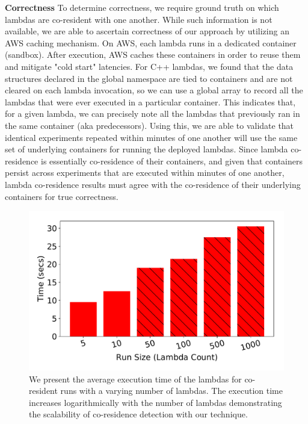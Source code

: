 \textbf{Correctness} 
To determine correctness, we require ground truth on which lambdas are
co-resident with one another. While such information is not available, we are
able to ascertain correctness of our approach by utilizing an AWS caching
mechanism. On AWS, each lambda runs in a dedicated container (sandbox).  After
execution, AWS caches these containers in order to reuse
them~\cite{awscontainerreuse} and mitigate "cold start" latencies. 
For C++ lambdas, we found that the data structures declared in the
global namespace are tied to containers and are not cleared on each lambda
invocation, so we can use a global array to record all the lambdas that were
ever executed in a particular container. This indicates that, for a given
lambda, we can precisely note all the lambdas that previously ran in the same
container (aka predecessors).  Using this, we are able to validate that
identical experiments repeated within minutes of one another will use the same
set of underlying containers for running the deployed lambdas. Since lambda
co-residence is essentially co-residence of their containers, and given that
containers persist across experiments that are executed within minutes of one
another, lambda co-residence results must agree with the co-residence of their
underlying containers for true correctness.


\begin{figure}[!t]
  \includegraphics[width=.99\linewidth]{fig/runtimes.pdf}
  \caption{We present the average execution time of the lambdas for co-resident
  runs with a varying number of lambdas. The execution time increases
  logarithmically with the number of lambdas demonstrating the scalability of
  co-residence detection with our technique.
\label{fig:runtimes}}
\end{figure}


